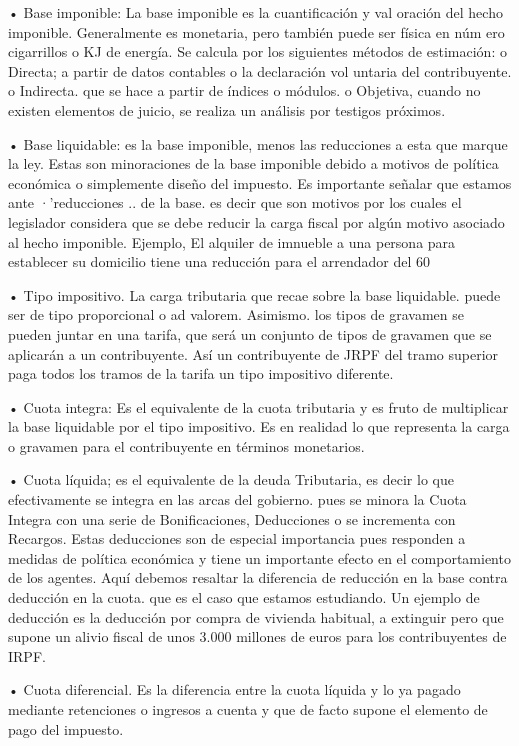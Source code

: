 \documentclass[10pt,a4paper]{article}
\begin{document}
{• Base imponible: La base imponible es la cuantificación y val oración del hecho imponible. Generalmente es monetaria, pero también puede ser física en núm ero cigarrillos o KJ de energía. Se calcula por los siguientes métodos de estimación: o Directa; a partir de datos contables o la declaración vol untaria del contribuyente. o Indirecta. que se hace a partir de índices o módulos. o Objetiva, cuando no existen elementos de juicio, se realiza un análisis por testigos próximos.

• Base liquidable: es la base imponible, menos las reducciones a esta que marque la ley. Estas son minoraciones de la base imponible debido a motivos de política económica o simplemente diseño del impuesto. Es importante señalar que estamos ante ·'reducciones .. de la base. es decir que son motivos por los cuales el legislador considera que se debe reducir la carga fiscal por algún motivo asociado al hecho imponible. Ejemplo, El alquiler de imnueble a una persona para establecer su domicilio tiene una reducción para el arrendador del 60%

• Tipo impositivo. La carga tributaria que recae sobre la base liquidable. puede ser de tipo proporcional o ad valorem. Asimismo. los tipos de gravamen se pueden juntar en una tarifa, que será un conjunto de tipos de gravamen que se aplicarán a un contribuyente. Así un contribuyente de JRPF del tramo superior paga todos los tramos de la tarifa un tipo impositivo diferente.

• Cuota integra: Es el equivalente de la cuota tributaria y es fruto de multiplicar la base liquidable por el tipo impositivo. Es en realidad lo que representa la carga o gravamen para el contribuyente en términos monetarios.

• Cuota líquida; es el equivalente de la deuda Tributaria, es decir lo que efectivamente se integra en las arcas del gobierno. pues se minora la Cuota Integra con una serie de Bonificaciones, Deducciones o se incrementa con Recargos. Estas deducciones son de especial importancia pues responden a medidas de política económica y tiene un importante efecto en el comportamiento de los agentes. Aquí debemos resaltar la diferencia de reducción en la base contra deducción en la cuota. que es el caso que estamos estudiando. Un ejemplo de deducción es la deducción por compra de vivienda habitual, a extinguir pero que supone un alivio fiscal de unos 3.000 millones de euros para los contribuyentes de IRPF.

• Cuota diferencial. Es la diferencia entre la cuota líquida y lo ya pagado mediante retenciones o ingresos a cuenta y que de facto supone el elemento de pago del impuesto.




}
\end{document}
